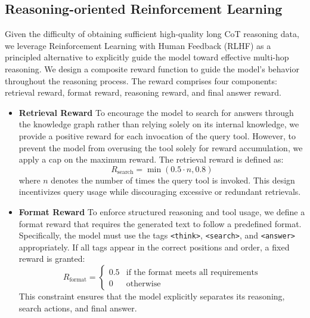 \documentclass[10pt,conference]{IEEEtran}
\begin{document}
\subsection{Reasoning-oriented Reinforcement Learning}
Given the difficulty of obtaining sufficient high-quality long CoT reasoning data, we leverage Reinforcement Learning with Human Feedback (RLHF) as a principled alternative to explicitly guide the model toward effective multi-hop reasoning. 
We design a composite reward function to guide the model's behavior throughout the reasoning process. The reward comprises four components: retrieval reward, format reward, reasoning reward, and final answer reward.
\begin{itemize}[leftmargin=1.5em]
\item \textbf{Retrieval Reward}
To encourage the model to search for answers through the knowledge graph rather than relying solely on its internal knowledge, we provide a positive reward for each invocation of the query tool. However, to prevent the model from overusing the tool solely for reward accumulation, we apply a cap on the maximum reward. The retrieval reward is defined as:
\begin{equation}
R_{\text{search}} = \min(0.5 \cdot n, 0.8)
\end{equation}
where $n$ denotes the number of times the query tool is invoked. This design incentivizes query usage while discouraging excessive or redundant retrievals.

\item \textbf{Format Reward}
To enforce structured reasoning and tool usage, we define a format reward that requires the generated text to follow a predefined format. Specifically, the model must use the tags \texttt{<think>}, \texttt{<search>}, and \texttt{<answer>} appropriately. If all tags appear in the correct positions and order, a fixed reward is granted:
\begin{equation}
R_{\text{format}} = 
\begin{cases}
0.5 & \text{if the format meets all requirements} \\
0   & \text{otherwise}
\end{cases}
\end{equation}
This constraint ensures that the model explicitly separates its reasoning, search actions, and final answer.


\end{itemize}
\end{document}

